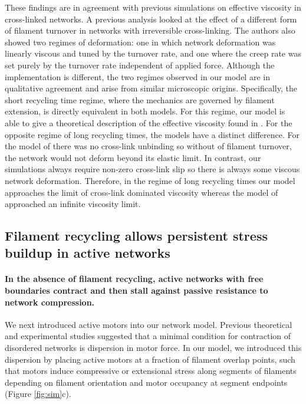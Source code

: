 \documentclass[10pt,letterpaper]{article}
\begin{document}
These findings are in agreement with previous simulations on effective viscosity in cross-linked networks. A previous analysis \cite{Kim2014526} looked at the effect of a different form of filament turnover in networks with irreversible cross-linking. The authors also showed two regimes of deformation: one in which network deformation was linearly viscous and tuned by the turnover rate, and one where the creep rate was set purely by the turnover rate independent of applied force.  Although the implementation is different, the two regimes observed in our model are in qualitative agreement and arise from similar microscopic origins. Specifically, the short recycling time regime, where the mechanics are governed by filament extension, is directly equivalent in both models.  For this regime, our model is able to give a theoretical description of the effective viscosity found in \cite{Kim2014526}.  For the opposite regime of long recycling times, the models have a distinct difference.  For the model of \cite{Kim2014526} there was no cross-link unbinding so without of filament turnover, the network would not deform beyond its elastic limit.  In contrast, our simulations always require non-zero cross-link slip so there is always some viscous network deformation.  Therefore, in the regime of long recycling times our model approaches the limit of cross-link dominated viscosity whereas the model of \cite{Kim2014526} approached an infinite viscosity limit.






\subsection*{Filament recycling allows persistent stress buildup in active networks}

\paragraph{In the absence of filament recycling, active networks with free boundaries contract and then stall against passive resistance to network compression.}
We next introduced active motors into our network model.  Previous theoretical and experimental studies\cite{1367-2630-14-3-033037,rheo_2D1,rheo_active} suggested that a minimal condition for contraction of disordered networks is dispersion in motor force.  In our model, we introduced this dispersion by placing active motors at a fraction of filament overlap points, such that motors induce compressive or extensional stress along segments of filaments depending on filament orientation and motor occupancy at segment endpoints (Figure \ref{fig:sim}c).
\end{document}
